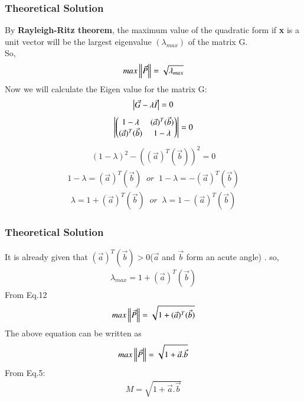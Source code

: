 \documentclass{beamer}
\begin{document}
\begin{frame}
\frametitle{Theoretical Solution}
    By \textbf{Rayleigh-Ritz theorem}, the maximum value of the quadratic form if \textbf{x} is a unit vector will be the largest eigenvalue $(\lambda_{max})$ of the matrix G.\\
So,
\begin{align}
    max\left\lVert\Vec{P}\right\rVert=\sqrt{\lambda_{max}}
\end{align}
Now we will calculate the Eigen value for the matrix G:
\begin{align}
    \begin{vmatrix}\Vec{G}-\lambda \Vec{I}\end{vmatrix}=0
\end{align}
\begin{align}
    \begin{vmatrix}\begin{pmatrix}1-\lambda&(\Vec{a})^T(\Vec{b})\\(\Vec{a})^T(\Vec{b})&1-\lambda\end{pmatrix}\end{vmatrix}=0
\end{align}
\begin{align}
    (1-\lambda)^2-((\Vec{a})^T(\Vec{b}))^2=0
\end{align}
\begin{align}
    1-\lambda=(\Vec{a})^T(\Vec{b})\;\;or\;\;1-\lambda=-(\Vec{a})^T(\Vec{b})
\end{align}
\begin{align}
    \lambda=1+(\Vec{a})^T(\Vec{b})\;\;or \;\;\lambda=1-(\Vec{a})^T(\Vec{b})
\end{align}


\end{frame}
\begin{frame}
\frametitle{Theoretical Solution}
  It is already given that $(\Vec{a})^T(\Vec{b})>0 $($\Vec{a}$ and $\Vec{b}$ form an acute angle) . so,
\begin{align}
 \lambda_{max}=1+  (\Vec{a})^T(\Vec{b}) 
\end{align}
From Eq.12
\begin{align}
    max\left\lVert\Vec{P}\right\rVert=\sqrt{1+  (\Vec{a})^T(\Vec{b}) }
\end{align}
The above equation can be written as
\begin{align}
   max \left\lVert\Vec{P}\right\rVert=\sqrt{1+\Vec{a}.\Vec{b}}
\end{align}
From Eq.5:
\begin{align}
    M=\sqrt{1+\Vec{a}.\Vec{b}}
\end{align}


\end{frame}
\end{document}
